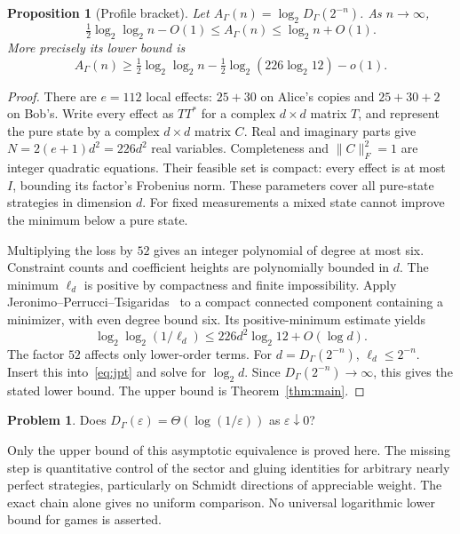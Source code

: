 \documentclass[11pt]{article}
\newtheorem{proposition}[theorem]{Proposition}
\theoremstyle{definition}
\newtheorem{problem}[theorem]{Problem}
\newcommand{\eps}{\varepsilon}
\begin{document}
\begin{proposition}[Profile bracket]\label{prop:profile}
Let $A_\Gamma(n)=\log_2D_\Gamma(2^{-n})$. As $n\to\infty$,
\begin{equation}\label{eq:profile}
\tfrac12\log_2\log_2 n-O(1)\leq A_\Gamma(n)\leq\log_2n+O(1).
\end{equation}
More precisely its lower bound is
\[
A_\Gamma(n)\geq\tfrac12\log_2\log_2 n
-\tfrac12\log_2(226\log_2 12)-o(1).
\]
\end{proposition}
\begin{proof}
There are $e=112$ local effects: $25+30$ on Alice's copies and $25+30+2$ on Bob's. Write every effect as $TT^*$ for a complex $d\times d$ matrix $T$, and represent the pure state by a complex $d\times d$ matrix $C$. Real and imaginary parts give $N=2(e+1)d^2=226d^2$ real variables. Completeness and $\|C\|_F^2=1$ are integer quadratic equations. Their feasible set is compact: every effect is at most $I$, bounding its factor's Frobenius norm. These parameters cover all pure-state strategies in dimension $d$. For fixed measurements a mixed state cannot improve the minimum below a pure state.

Multiplying the loss by $52$ gives an integer polynomial of degree at most six. Constraint counts and coefficient heights are polynomially bounded in $d$. The minimum $\ell_d$ is positive by compactness and finite impossibility. Apply Jeronimo--Perrucci--Tsigaridas~\cite[Theorem~1]{JPT} to a compact connected component containing a minimizer, with even degree bound six. Its positive-minimum estimate yields
\begin{equation}\label{eq:jpt}
\log_2\log_2(1/\ell_d)\leq226d^2\log_2 12+O(\log d).
\end{equation}
The factor $52$ affects only lower-order terms. For $d=D_\Gamma(2^{-n})$, $\ell_d\leq2^{-n}$. Insert this into~\eqref{eq:jpt} and solve for $\log_2d$. Since $D_\Gamma(2^{-n})\to\infty$, this gives the stated lower bound. The upper bound is Theorem~\ref{thm:main}.
\end{proof}

\begin{problem}\label{prob:logarithmic}
Does $D_\Gamma(\eps)=\Theta(\log(1/\eps))$ as $\eps\downarrow0$?
\end{problem}
Only the upper bound of this asymptotic equivalence is proved here. The missing step is quantitative control of the sector and gluing identities for arbitrary nearly perfect strategies, particularly on Schmidt directions of appreciable weight. The exact chain alone gives no uniform comparison. No universal logarithmic lower bound for games is asserted.
\end{document}
